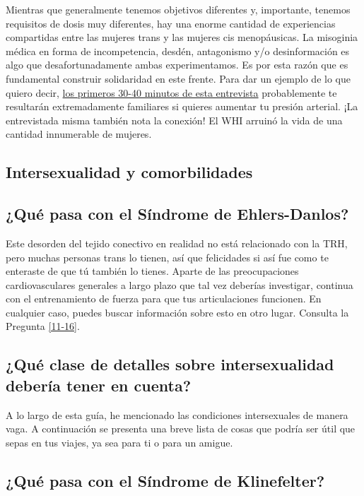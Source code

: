 \documentclass{article}
\begin{document}
Mientras que generalmente tenemos objetivos diferentes y, importante, tenemos requisitos de dosis muy diferentes, hay una enorme cantidad de experiencias compartidas entre las mujeres trans y las mujeres cis menopáusicas. La misoginia médica en forma de incompetencia, desdén, antagonismo y/o desinformación es algo que desafortunadamente ambas experimentamos. Es por esta razón que es fundamental construir solidaridad en este frente. Para dar un ejemplo de lo que quiero decir, \href{https://www.youtube.com/watch?v=W0XW6av2wLQ}{los primeros 30-40 minutos de esta entrevista} probablemente te resultarán extremadamente familiares si quieres aumentar tu presión arterial. ¡La entrevistada misma también nota la conexión! El WHI arruinó la vida de una cantidad innumerable de mujeres.

\subsection*{Intersexualidad y comorbilidades}

\subsection{¿Qué pasa con el Síndrome de Ehlers-Danlos?}

Este desorden del tejido conectivo en realidad no está relacionado con la TRH, pero muchas personas trans lo tienen, así que felicidades si así fue como te enteraste de que tú también lo tienes. Aparte de las preocupaciones cardiovasculares generales a largo plazo que tal vez deberías investigar, continua con el entrenamiento de fuerza para que tus articulaciones funcionen. En cualquier caso, puedes buscar información sobre esto en otro lugar. Consulta la Pregunta \ref{11-16}.

\subsection{¿Qué clase de detalles sobre intersexualidad debería tener en cuenta?}

A lo largo de esta guía, he mencionado las condiciones intersexuales de manera vaga. A continuación se presenta una breve lista de cosas que podría ser útil que sepas en tus viajes, ya sea para ti o para un amigue.

\subsection{¿Qué pasa con el Síndrome de Klinefelter?}
\end{document}
